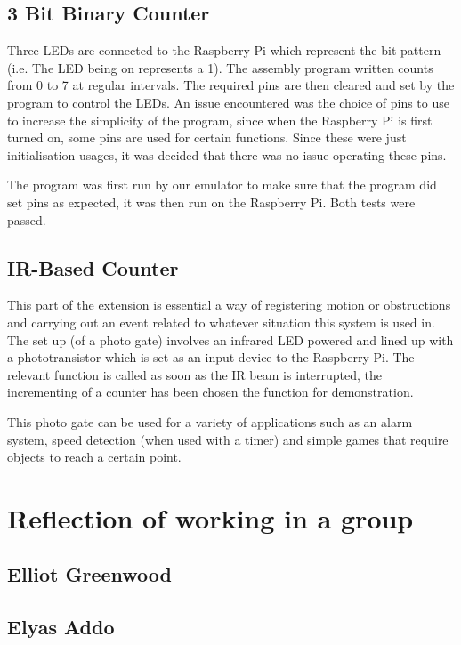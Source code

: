 \documentclass[11pt]{article}
\begin{document}
\subsection{3 Bit Binary Counter}
 Three LEDs are connected to the Raspberry Pi which represent the bit pattern (i.e. The LED being on represents a 1). The assembly program written counts from 0 to 7 at regular intervals. The required pins are then cleared and set by the program to control the LEDs. An issue encountered was the choice of pins to use to increase the simplicity of the program, since when the Raspberry Pi is first turned on, some pins are used for certain functions. Since these were just initialisation usages, it was decided that there was no issue operating these pins.

 The program was first run by our emulator to make sure that the program did set pins as expected, it was then run on the Raspberry Pi. Both tests were passed.

\subsection{IR-Based Counter}
This part of the extension is essential a way of registering motion or obstructions and carrying out an event related to whatever situation this system is used in. The set up (of a photo gate) involves an infrared LED powered and lined up with a phototransistor which is set as an input device to the Raspberry Pi. The relevant function is called as soon as the IR beam is interrupted, the incrementing of a counter has been chosen the function for demonstration.\newline

\noindent This photo gate can be used for a variety of applications such as an alarm system, speed detection (when used with a timer) and simple games that require objects to reach a certain point.\newline



\section{Reflection of working in a group}
\subsection{Elliot Greenwood}
\subsection{Elyas Addo}
\end{document}
